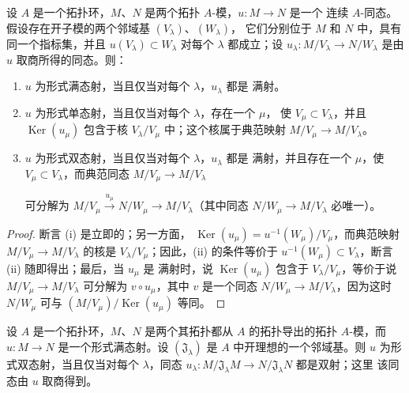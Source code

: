 \begin{proposition}[19.1.3]
\label{0.19.1.3-fr}
设 $A$ 是一个拓扑环，$M$、$N$ 是两个拓扑 $A$-模，$u:M\to N$ 是一个
连续 $A$-同态。假设存在开子模的两个邻域基 $(V_\lambda)$、$(W_\lambda)$，
它们分别位于 $M$ 和 $N$ 中，具有同一个指标集，并且
$u(V_\lambda)\subset W_\lambda$ 对每个 $\lambda$ 都成立；设
$u_\lambda:M/V_\lambda\to N/W_\lambda$ 是由 $u$ 取商所得的同态。则：
\begin{enumerate}
  \item[(i)] $u$ 为形式满态射，当且仅当对每个 $\lambda$，$u_\lambda$ 都是
  满射。
  \item[(ii)] $u$ 为形式单态射，当且仅当对每个 $\lambda$，存在一个 $\mu$，
  使 $V_\mu\subset V_\lambda$，并且 $\operatorname{Ker}(u_\mu)$ 包含于核
  $V_\lambda/V_\mu$ 中；这个核属于典范映射 $M/V_\mu\to M/V_\lambda$。
  \item[(iii)] $u$ 为形式双态射，当且仅当对每个 $\lambda$，$u_\lambda$ 都是
  满射，并且存在一个 $\mu$，使 $V_\mu\subset V_\lambda$，而典范同态
  $M/V_\mu\to M/V_\lambda$


  \noindent 可分解为
  $M/V_\mu\xrightarrow{u_\mu}N/W_\mu\to M/V_\lambda$（其中同态
  $N/W_\mu\to M/V_\lambda$ 必唯一）。
\end{enumerate}
\end{proposition}

\begin{proof}
断言 (i) 是立即的；另一方面，
$\operatorname{Ker}(u_\mu)=u^{-1}(W_\mu)/V_\mu$，而典范映射
$M/V_\mu\to M/V_\lambda$ 的核是 $V_\lambda/V_\mu$；因此，(ii) 的条件等价于
$u^{-1}(W_\mu)\subset V_\lambda$，断言 (ii) 随即得出；最后，当 $u_\mu$ 是
满射时，说 $\operatorname{Ker}(u_\mu)$ 包含于 $V_\lambda/V_\mu$，等价于说
$M/V_\mu\to M/V_\lambda$ 可分解为 $v\circ u_\mu$，其中 $v$ 是一个同态
$N/W_\mu\to M/V_\lambda$，因为这时 $N/W_\mu$ 可与
$(M/V_\mu)/\operatorname{Ker}(u_\mu)$ 等同。
\end{proof}

\begin{corollary}[19.1.4]
\label{0.19.1.4-fr}
设 $A$ 是一个拓扑环，$M$、$N$ 是两个其拓扑都从 $A$ 的拓扑导出的拓扑
$A$-模，而 $u:M\to N$ 是一个形式满态射。设 $(\mathfrak J_\lambda)$ 是 $A$
中开理想的一个邻域基。则 $u$ 为形式双态射，当且仅当对每个 $\lambda$，同态
$u_\lambda:M/\mathfrak J_\lambda M\to N/\mathfrak J_\lambda N$ 都是双射；这里
该同态由 $u$ 取商得到。
\end{corollary}

